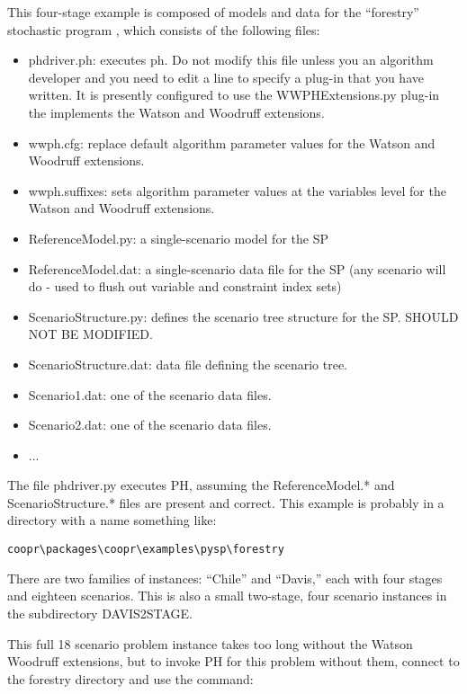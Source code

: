 This four-stage example is composed of models and data for the ``forestry'' stochastic program \cite{}, which consists of the following files:

\begin{itemize}
\item phdriver.ph: executes ph. Do not modify this file unless you an algorithm developer and you 
need to edit a line to specify a plug-in that you have written. It is presently configured to use the WWPHExtensions.py plug-in the implements the Watson and Woodruff extensions.
\item wwph.cfg: replace default algorithm parameter values for the Watson and Woodruff extensions.
\item wwph.suffixes: sets algorithm parameter values at the variables level for the Watson and Woodruff extensions.
\item ReferenceModel.py: a single-scenario model for the SP
\item ReferenceModel.dat: a single-scenario data file for the SP (any scenario will do - used to flush out variable and constraint index sets)
\item ScenarioStructure.py: defines the scenario tree structure for the SP. SHOULD NOT BE MODIFIED.
\item ScenarioStructure.dat: data file defining the scenario tree.
\item Scenario1.dat: one of the scenario data files.
\item Scenario2.dat: one of the scenario data files.
\item ...
\end{itemize}

The file phdriver.py executes PH, assuming the ReferenceModel.* and ScenarioStructure.* files are present and correct. 
This example is probably in a directory with a name something like:

\begin{verbatim}
coopr\packages\coopr\examples\pysp\forestry
\end{verbatim}


There are two families of instances: ``Chile'' and ``Davis,'' each with four stages and eighteen scenarios. This is also a small
two-stage, four scenario instances in the subdirectory DAVIS2STAGE.

This full 18 scenario problem instance takes too long without the Watson Woodruff extensions, but to
invoke PH for this problem without them, connect to the forestry directory and use the command:

